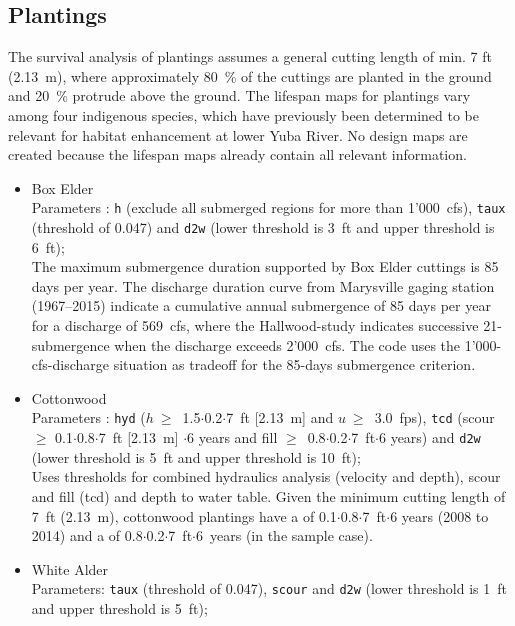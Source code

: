 \subsection{Plantings}\label{sec:plants}
The survival analysis of plantings assumes a general cutting length of min. 7 ft (2.13~m), where approximately 80~$\%$ of the cuttings are planted in the ground and 20~$\%$ protrude above the ground. The lifespan maps for plantings vary among four indigenous species, which have previously been determined to be relevant for habitat enhancement at lower Yuba River. No design maps are created because the lifespan maps already contain all relevant information.
\begin{itemize}
	\item Box Elder\\
	Parameters \citep[extracted from][]{friedman99, kui16a}: \texttt{h} (exclude all submerged regions for more than 1'000~cfs), \texttt{taux} (threshold of 0.047) and \texttt{d2w} (lower threshold is 3~ft and upper threshold is 6~ft);\\
	The maximum submergence duration supported by Box Elder cuttings is 85 days per year. The discharge duration curve from Marysville gaging station (1967--2015) indicate a cumulative annual submergence of 85 days per year for a discharge of 569~cfs, where the Hallwood-study indicates successive 21-submergence when the discharge exceeds 2'000~cfs. The code uses the 1'000-cfs-discharge situation as tradeoff for the 85-days submergence criterion.
	\item Cottonwood\\
	Parameters \citep[extracted from][]{stromberg93, polzin06, wilcox13, bywater15, kui16a}: \texttt{hyd} ($h~\geq$~1.5$\cdot$0.2$\cdot$7~ft [2.13~m] and $u~\geq$~3.0~fps), \texttt{tcd} (scour$\geq$ 0.1$\cdot$0.8$\cdot$7~ft [2.13~m] $\cdot$6 years and fill $\geq$~0.8$\cdot$0.2$\cdot$7~ft$\cdot$6 years) and \texttt{d2w} (lower threshold is 5~ft and upper threshold is 10~ft);\\
	Uses thresholds for combined hydraulics analysis (velocity and depth), scour and fill (tcd) and depth to water table. Given the minimum cutting length of 7~ft (2.13~m), cottonwood plantings have a  of 0.1$\cdot$0.8$\cdot$7~ft$\cdot$6 years (2008 to 2014) and a  of 0.8$\cdot$0.2$\cdot$7~ft$\cdot$6~years (in the sample case).
	\item White Alder\\
	Parameters: \texttt{taux} (threshold of 0.047), \texttt{scour} \citep[$\geq$~1~ft$\cdot$6~years in the sample case, cf.][]{jablkowski17} and \texttt{d2w} (lower threshold is 1~ft and upper threshold is 5~ft);\\

\end{itemize}
